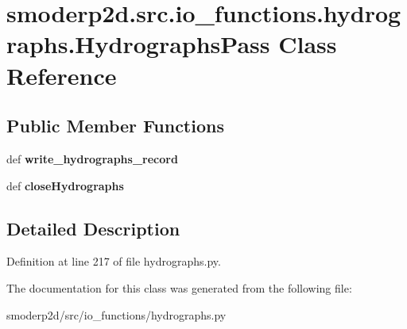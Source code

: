 \hypertarget{classsmoderp2d_1_1src_1_1io__functions_1_1hydrographs_1_1HydrographsPass}{\section{smoderp2d.\-src.\-io\-\_\-functions.\-hydrographs.\-Hydrographs\-Pass Class Reference}
\label{classsmoderp2d_1_1src_1_1io__functions_1_1hydrographs_1_1HydrographsPass}
}
\subsection*{Public Member Functions}
\begin{DoxyCompactItemize}
\item 
\hypertarget{classsmoderp2d_1_1src_1_1io__functions_1_1hydrographs_1_1HydrographsPass_a76fee1fd128fa9c9d26fede127fc68b7}{def {\bfseries write\-\_\-hydrographs\-\_\-record}}\label{classsmoderp2d_1_1src_1_1io__functions_1_1hydrographs_1_1HydrographsPass_a76fee1fd128fa9c9d26fede127fc68b7}

\item 
\hypertarget{classsmoderp2d_1_1src_1_1io__functions_1_1hydrographs_1_1HydrographsPass_a8dc82a5cbcfa1d913f73004befa159e9}{def {\bfseries close\-Hydrographs}}\label{classsmoderp2d_1_1src_1_1io__functions_1_1hydrographs_1_1HydrographsPass_a8dc82a5cbcfa1d913f73004befa159e9}

\end{DoxyCompactItemize}


\subsection{Detailed Description}


Definition at line 217 of file hydrographs.\-py.



The documentation for this class was generated from the following file\-:\begin{DoxyCompactItemize}
\item 
smoderp2d/src/io\-\_\-functions/hydrographs.\-py\end{DoxyCompactItemize}

